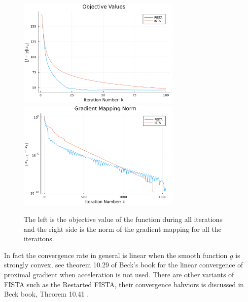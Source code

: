 \documentclass[]{article}
\theoremstyle{definition}
\begin{document}
        \begin{figure}[h]
            \centering
            \includegraphics*[width=8cm]{simple_lass_obj.png}
                \includegraphics*[width=8cm]{simple_lass_pgrad.png}
            \caption{The left is the objective value of the function during all iterations and the right side is the norm of the gradient mapping for all the iteraitons. }
            \label{fig:lasso_1}
        \end{figure}
        In fact the convergence rate in general is linear when the smooth function $g$ is strongly convex, see theorem 10.29 of Beck's book\cite{book:first_order_opt} for the linear convergence of proximal gradient when acceleration is not used. There are other variants of FISTA such as the Restarted FISTA, their convergence bahviors is discussed in Beck book, Theorem 10.41 \cite{book:first_order_opt}. 
        
\end{document}
